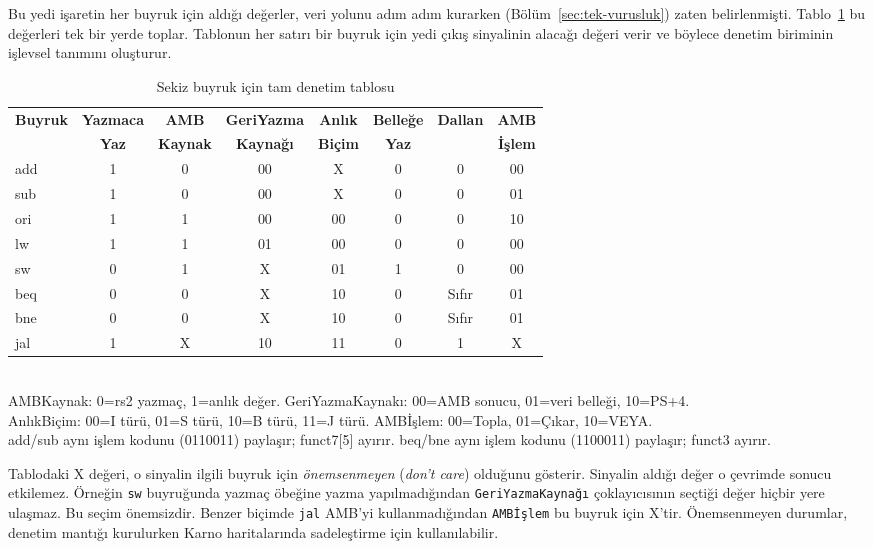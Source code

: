 Bu yedi işaretin her buyruk için aldığı değerler, veri yolunu adım adım kurarken (Bölüm~\ref{sec:tek-vurusluk}) zaten belirlenmişti. Tablo~\ref{tab:tum-denetim} bu değerleri tek bir yerde toplar. Tablonun her satırı bir buyruk için yedi çıkış sinyalinin alacağı değeri verir ve böylece denetim biriminin işlevsel tanımını oluşturur.

\begin{table}[htbp]
\centering
\caption{Sekiz buyruk için tam denetim tablosu}
\label{tab:tum-denetim}
\small
\begin{tabular}{l|c|c|c|c|c|c|c}
\toprule
\textbf{Buyruk} & \textbf{Yazmaca} & \textbf{AMB} & \textbf{GeriYazma} & \textbf{Anlık} & \textbf{Belleğe} & \textbf{Dallan} & \textbf{AMB} \\
 & \textbf{Yaz} & \textbf{Kaynak} & \textbf{Kaynağı} & \textbf{Biçim} & \textbf{Yaz} & & \textbf{İşlem} \\
\midrule
add  & 1 & 0 & 00 & X  & 0 & 0      & 00 \\
sub  & 1 & 0 & 00 & X  & 0 & 0      & 01 \\
ori  & 1 & 1 & 00 & 00 & 0 & 0      & 10 \\
lw   & 1 & 1 & 01 & 00 & 0 & 0      & 00 \\
sw   & 0 & 1 & X  & 01 & 1 & 0      & 00 \\
beq  & 0 & 0 & X  & 10 & 0 & Sıfır  & 01 \\
bne  & 0 & 0 & X  & 10 & 0 & \textlnot{}Sıfır & 01 \\
jal  & 1 & X & 10 & 11 & 0 & 1      & X  \\
\bottomrule
\end{tabular}
\footnotesize \\[0.3em]
AMBKaynak: 0=rs2 yazmaç, 1=anlık değer. GeriYazmaKaynakı: 00=AMB sonucu, 01=veri belleği, 10=PS+4. \\
AnlıkBiçim: 00=I türü, 01=S türü, 10=B türü, 11=J türü. AMBİşlem: 00=Topla, 01=Çıkar, 10=VEYA. \\
add/sub aynı işlem kodunu (0110011) paylaşır; funct7{[5]} ayırır. beq/bne aynı işlem kodunu (1100011) paylaşır; funct3 ayırır.
\end{table}

Tablodaki X değeri, o sinyalin ilgili buyruk için \emph{önemsenmeyen} (\emph{don't care}) olduğunu gösterir. Sinyalin aldığı değer o çevrimde sonucu etkilemez. Örneğin \texttt{sw} buyruğunda yazmaç öbeğine yazma yapılmadığından \texttt{GeriYazmaKaynağı} çoklayıcısının seçtiği değer hiçbir yere ulaşmaz. Bu seçim önemsizdir. Benzer biçimde \texttt{jal} AMB'yi kullanmadığından \texttt{AMBİşlem} bu buyruk için X'tir. Önemsenmeyen durumlar, denetim mantığı kurulurken Karno haritalarında sadeleştirme için kullanılabilir.

